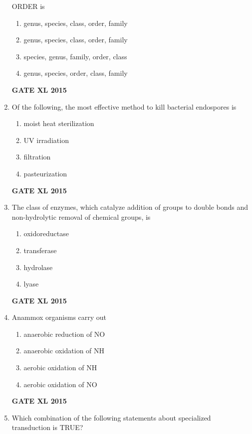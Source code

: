 \documentclass[journal,12pt,onecolumn]{IEEEtran}
\begin{document}
\begin{enumerate}
ORDER is
    \begin{enumerate}
            \item genus, species, class, order, family
	    \item genus, species, class, order, family
	    \item species, genus, family, order, class
            \item genus, species, order, class, family
    \end{enumerate}
\begin{flushright}\textbf{GATE XL 2015}\end{flushright}
\item Of the following, the most effective method to kill bacterial endospores is 
    \begin{enumerate}
            \item moist heat sterilization
	    \item UV irradiation
	    \item filtration
            \item pasteurization
    \end{enumerate}
\begin{flushright}\textbf{GATE XL 2015}\end{flushright}
\item The class of enzymes, which catalyze addition of groups to double bonds and non-hydrolytic removal of chemical groups, is
    \begin{enumerate}
            \item oxidoreductase
	    \item transferase
	    \item hydrolase
            \item lyase
    \end{enumerate}
\begin{flushright}\textbf{GATE XL 2015}\end{flushright}
\item Anammox organisms carry out
    \begin{enumerate}
            \item anaerobic reduction of NO
	    \item anaerobic oxidation of NH 
	    \item aerobic oxidation of NH
            \item aerobic oxidation of NO
    \end{enumerate}
\begin{flushright}\textbf{GATE XL 2015}\end{flushright}
\item Which combination of the following statements about specialized transduction is TRUE?


\end{enumerate}
\end{document}
